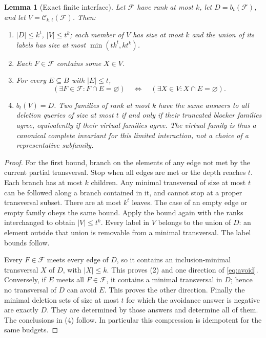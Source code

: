 \documentclass[11pt]{article}
\newtheorem{lemma}[theorem]{Lemma}
\theoremstyle{remark}\newtheorem{remark}[theorem]{Remark}
\begin{document}
\begin{lemma}[Exact finite interface]\label{lem:interface}
Let $\mathcal F$ have rank at most $k$, let $D=b_t(\mathcal F)$, and let $V=\mathcal C_{k,t}(\mathcal F)$. Then:
\begin{enumerate}
\item $|D|\le k^t$, $|V|\le t^k$; each member of $V$ has size at most $k$ and the union of its labels has size at most $\min(tk^t,kt^k)$.
\item Each $F\in\mathcal F$ contains some $X\in V$.
\item For every $E\subseteq B$ with $|E|\le t$,
\begin{equation}\label{eq:avoid}
 (\exists F\in\mathcal F:F\cap E=\varnothing)
 \quad\Longleftrightarrow\quad
 (\exists X\in V:X\cap E=\varnothing).
\end{equation}
\item $b_t(V)=D$. Two families of rank at most $k$ have the same answers to all deletion queries of size at most $t$ if and only if their truncated blocker families agree, equivalently if their virtual families agree. The virtual family is thus a canonical complete invariant for this limited interaction, not a choice of a representative subfamily.
\end{enumerate}
\end{lemma}
\begin{proof}
For the first bound, branch on the elements of any edge not met by the current partial transversal. Stop when all edges are met or the depth reaches $t$. Each branch has at most $k$ children. Any minimal transversal of size at most $t$ can be followed along a branch contained in it, and cannot stop at a proper transversal subset. There are at most $k^t$ leaves. The case of an empty edge or empty family obeys the same bound. Apply the bound again with the ranks interchanged to obtain $|V|\le t^k$. Every label in $V$ belongs to the union of $D$: an element outside that union is removable from a minimal transversal. The label bounds follow.

Every $F\in\mathcal F$ meets every edge of $D$, so it contains an inclusion-minimal transversal $X$ of $D$, with $|X|\le k$. This proves (2) and one direction of \eqref{eq:avoid}. Conversely, if $E$ meets all $F\in\mathcal F$, it contains a minimal transversal in $D$; hence no transversal of $D$ can avoid $E$. This proves the other direction. Finally the minimal deletion sets of size at most $t$ for which the avoidance answer is negative are exactly $D$. They are determined by those answers and determine all of them. The conclusions in (4) follow. In particular this compression is idempotent for the same budgets.
\end{proof}
\end{document}
